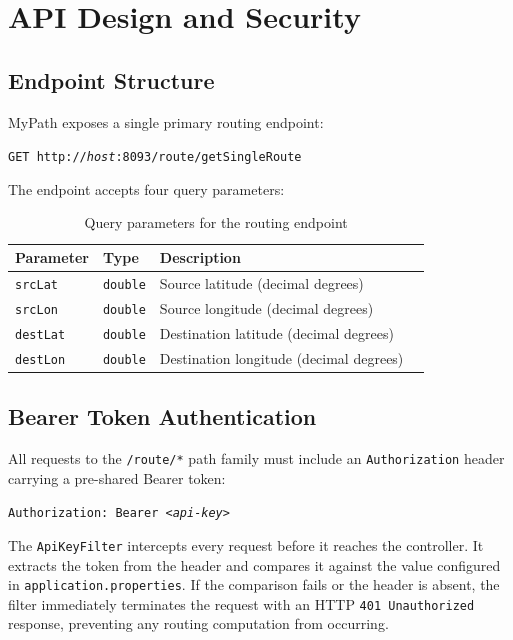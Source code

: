 \documentclass[12pt, a4paper]{report}
\begin{document}
\section{API Design and Security}
\label{sec:api}

\subsection{Endpoint Structure}
\label{subsec:endpoint}

MyPath exposes a single primary routing endpoint:

\begin{center}
\texttt{GET http://\textit{host}:8093/route/getSingleRoute}
\end{center}

The endpoint accepts four query parameters:

\begin{table}[H]
\centering
\caption{Query parameters for the routing endpoint}
\begin{tabular}{@{}llll@{}}
\toprule
\textbf{Parameter} & \textbf{Type} & \textbf{Description} \\
\midrule
\texttt{srcLat} & \texttt{double} & Source latitude (decimal degrees) \\
\texttt{srcLon} & \texttt{double} & Source longitude (decimal degrees) \\
\texttt{destLat} & \texttt{double} & Destination latitude (decimal degrees) \\
\texttt{destLon} & \texttt{double} & Destination longitude (decimal degrees) \\
\bottomrule
\end{tabular}
\end{table}

\subsection{Bearer Token Authentication}
\label{subsec:auth}

All requests to the \texttt{/route/*} path family must include an \texttt{Authorization} header carrying a pre-shared Bearer token:

\begin{center}
\texttt{Authorization: Bearer \textit{<api-key>}}
\end{center}

The \texttt{ApiKeyFilter} intercepts every request before it reaches the controller. It extracts the token from the header and compares it against the value configured in \texttt{application.properties}. If the comparison fails or the header is absent, the filter immediately terminates the request with an HTTP \texttt{401 Unauthorized} response, preventing any routing computation from occurring.
\end{document}
